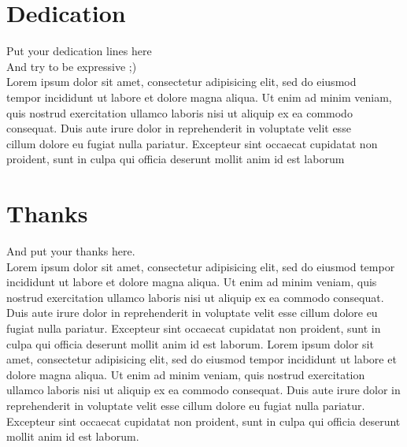 \chapter*{Dedication}
\thispagestyle{empty}
%
\begin{center}
  Put your dedication lines here ~\\
  And try to be expressive ;) ~\\


  Lorem ipsum dolor sit amet, consectetur adipisicing elit, sed do eiusmod ~\\
  tempor incididunt ut labore et dolore magna aliqua. Ut enim ad minim veniam, ~\\
  quis nostrud exercitation ullamco laboris nisi ut aliquip ex ea commodo ~\\
  consequat. Duis aute irure dolor in reprehenderit in voluptate velit esse ~\\
  cillum dolore eu fugiat nulla pariatur. Excepteur sint occaecat cupidatat non ~\\
  proident, sunt in culpa qui officia deserunt mollit anim id est laborum ~\\
\end{center}
%
%
%
%
%
%
%
\cleardoublepage%
\chapter*{Thanks}
\thispagestyle{empty}
%
And put your thanks here. ~\\

Lorem ipsum dolor sit amet, consectetur adipisicing elit, sed do eiusmod
tempor incididunt ut labore et dolore magna aliqua. Ut enim ad minim veniam,
quis nostrud exercitation ullamco laboris nisi ut aliquip ex ea commodo
consequat. Duis aute irure dolor in reprehenderit in voluptate velit esse
cillum dolore eu fugiat nulla pariatur. Excepteur sint occaecat cupidatat non
proident, sunt in culpa qui officia deserunt mollit anim id est laborum. Lorem ipsum dolor sit amet, consectetur adipisicing elit, sed do eiusmod
tempor incididunt ut labore et dolore magna aliqua. Ut enim ad minim veniam,
quis nostrud exercitation ullamco laboris nisi ut aliquip ex ea commodo
consequat. Duis aute irure dolor in reprehenderit in voluptate velit esse
cillum dolore eu fugiat nulla pariatur. Excepteur sint occaecat cupidatat non
proident, sunt in culpa qui officia deserunt mollit anim id est laborum.